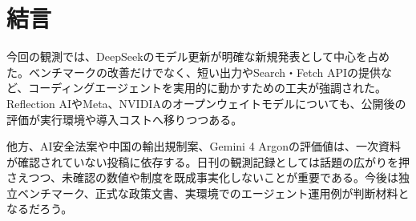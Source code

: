 \section*{結言}
今回の観測では、DeepSeekのモデル更新が明確な新規発表として中心を占めた。ベンチマークの改善だけでなく、短い出力やSearch・Fetch APIの提供など、コーディングエージェントを実用的に動かすための工夫が強調された。Reflection AIやMeta、NVIDIAのオープンウェイトモデルについても、公開後の評価が実行環境や導入コストへ移りつつある。

他方、AI安全法案や中国の輸出規制案、Gemini 4 Argonの評価値は、一次資料が確認されていない投稿に依存する。日刊の観測記録としては話題の広がりを押さえつつ、未確認の数値や制度を既成事実化しないことが重要である。今後は独立ベンチマーク、正式な政策文書、実環境でのエージェント運用例が判断材料となるだろう。
